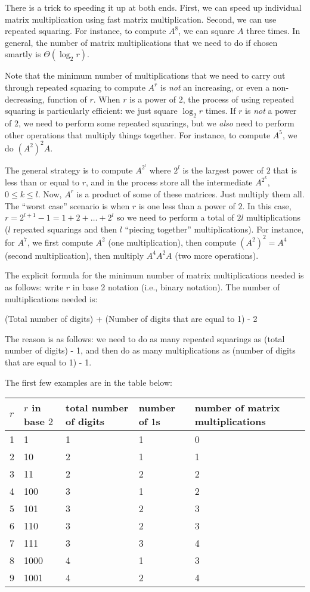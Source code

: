\documentclass[10pt]{amsart}
\begin{document}
There is a trick to speeding it up at both ends. First, we can speed
up individual matrix multiplication using fast matrix
multiplication. Second, we can use repeated squaring. For instance, to
compute $A^8$, we can square $A$ three times. In general, the number
of matrix multiplications that we need to do if chosen smartly is
$\Theta(\log_2r)$.

Note that the minimum number of multiplications that we need to carry
out through repeated squaring to compute $A^r$ is {\em not} an
increasing, or even a non-decreasing, function of $r$. When $r$ is a
power of $2$, the process of using repeated squaring is particularly
efficient: we just square $\log_2r$ times. If $r$ is {\em not} a power
of $2$, we need to perform some repeated squarings, but we {\em also}
need to perform other operations that multiply things together. For
instance, to compute $A^5$, we do $(A^2)^2A$.

The general strategy is to compute $A^{2^l}$ where $2^l$ is the
largest power of $2$ that is less than or equal to $r$, and in the
process store all the intermediate $A^{2^k}$, $0 \le k \le l$. Now,
$A^r$ is a product of some of these matrices. Just multiply them
all. The ``worst case'' scenario is when $r$ is one less than a power
of $2$. In this case, $r = 2^{l+1} - 1 = 1 + 2 + \dots + 2^l$ so we
need to perform a total of $2l$ multiplications ($l$ repeated
squarings and then $l$ ``piecing together'' multiplications). For
instance, for $A^7$, we first compute $A^2$ (one multiplication), then
compute $(A^2)^2 = A^4$ (second multiplication), then multiply $A^4A^2A$
(two more operations).

The explicit formula for the minimum number of matrix
multiplications needed is as follows: write $r$ in base 2 notation
(i.e., binary notation). The number of multiplications needed is:

(Total number of digits) + (Number of digits that are equal to 1) - 2

The reason is as follows: we need to do as many repeated squarings as
(total number of digits) - 1, and then do as many multiplications as
(number of digits that are equal to 1) - 1.

The first few examples are in the table below:
\vspace{0.2in}

\begin{tabular}{|l|l|l|l|l|}
  \hline
  $r$ & $r$ in base $2$ & total number of digits & number of $1$s & number of matrix multiplications\\\hline
  1 & 1 & 1 & 1 & 0\\\hline
  2 & 10 & 2 & 1 & 1\\\hline
  3 & 11 & 2 & 2 & 2 \\\hline
  4 & 100 & 3 & 1 & 2\\\hline
  5 & 101 & 3 & 2 & 3\\\hline
  6 & 110 & 3 & 2 & 3\\\hline
  7 & 111 & 3 & 3 & 4\\\hline
  8 & 1000 & 4 & 1 & 3\\\hline
  9 & 1001 & 4 & 2 & 4\\\hline
\end{tabular}
\end{document}
